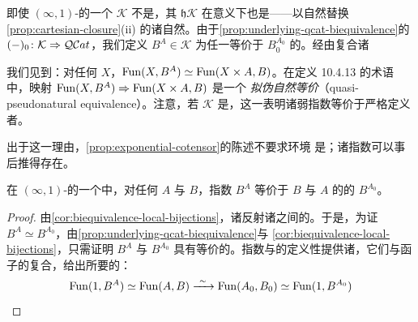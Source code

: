 \begin{observation}\label{obs:weak-exponentials}
即使 $(\infty,1)$-\trCategory{}的一个\trInfinityCosmos{} $\mathcal{K}$ 不是\trCartesianClosed，其\trHomotopyTwoCategory{} $\mathfrak{h}\mathcal{K}$ 在\trBicategorical{}意义下也是\trCartesianClosed——以自然\trEquivalence{}替换\cref{prop:cartesian-closure}(ii) 的诸自然\trIsomorphism。由于\cref{prop:underlying-qcat-biequivalence}的\trBiequivalence{} $(-)_{0}\colon\mathcal{K}\Rightarrow\mathcal{Q}\mathcal{C}at$，我们定义 $B^{A}\in\mathcal{K}$ 为任一\trUnderlyingQuasiCategory{}等价于 $B_{0}^{A_{0}}$ 的\trInfinityCategory。经由复合诸\trEquivalence
\begin{center}
\end{center}
我们见到：对任何 $X$，$\operatorname{Fun}(X,B^{A})\simeq\operatorname{Fun}(X\times A,B)$。在定义 10.4.13
的术语中，映射 $\operatorname{Fun}(X,B^{A})\Rightarrow\operatorname{Fun}(X\times A,B)$ 是一个%
\emph{拟伪自然等价}（quasi-pseudonatural equivalence）。注意，若 $\mathcal{K}$ 是\trCartesianClosed，这一\trUniversalProperty{}表明诸弱指数等价于严格定义者。
\end{observation}

出于这一理由，\cref{prop:exponential-cotensor}的陈述不要求环境%
\trInfinityCosmos{}是\trCartesianClosed；诸指数可以事后推得存在。

\begin{proposition}\label{prop:exponential-cotensor}
在 $(\infty,1)$-\trCategory{}的一个\trInfinityCosmos{}中，对任何%
\trInfinityCategory{} $A$ 与 $B$，指数 $B^{A}$ 等价于 $B$ 与 $A$ 的\trUnderlyingQuasiCategory{}的\trCotensor{} $B^{A_{0}}$。
\end{proposition}

\begin{proof}
由\cref{cor:biequivalence-local-bijections}，诸\trCosmologicalBiequivalence{}反射诸\trInfinityCategory{}之间的\trEquivalence。于是，为证
$B^{A}\simeq B^{A_{0}}$，由\cref{prop:underlying-qcat-biequivalence}与%
\cref{cor:biequivalence-local-bijections}，只需证明 $B^{A}$ 与 $B^{A_{0}}$ 具有等价的\trUnderlyingQuasiCategory。指数与\trCotensor{}的定义性\trUniversalProperty{}提供诸\trEquivalence，它们与\trUnderlyingQuasiCategory{}函子的\trLocalEquivalence{}复合，给出所要的\trEquivalence：
\begin{equation*}
\Fun(1,B^{A})\simeq\Fun(A,B)\xrightarrow{\ \sim\ }\Fun(A_{0},B_{0})\simeq\Fun(1,B^{A_{0}})
\end{equation*}
\end{proof}

